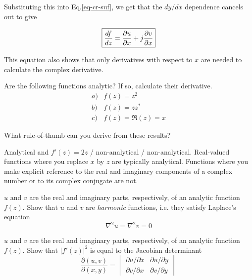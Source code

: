 Substituting this into Eq.\ref{eq-cr-suf}, we get that the $d y / d x$ dependence cancels out to give

\begin{equation}
\fbox{$\displaystyle
\frac{d f}{d z} = \frac{\partial u}{\partial x}+j\frac{\partial v}{\partial x}
$}
\end{equation} 

This equation also shows that only derivatives with respect to $x$ are needed to calculate the complex derivative.

\pagebreak

\begin{exer}
Are the following functions analytic? If so, calculate their derivative.
$$\begin{array}{lcll}a) & f(z)=z^2 \\b) & f(z)=z z^* \\c) & f(z)= \Re(z)=x \end{array}$$

What rule-of-thumb can you derive from these results?

\begin{sol}
Analytical and $f'(z)=2z$ / non-analytical / non-analytical. Real-valued functions where you replace $x$ by $z$ are typically analytical. Functions where you make explicit reference to the real and imaginary components of a complex number or to its complex conjugate are not.
\end{sol}
  
\end{exer}

\begin{exer}
\label{ex-harmonic}
$u$ and $v$ are the real and imaginary parts, respectively, of an analytic function $f(z)$. Show that $u$ and $v$ are \emph{harmonic} functions, i.e. they satisfy Laplace's equation
$$\nabla^2 u = \nabla^2 v = 0$$
\end{exer}

\begin{exer}
$u$ and $v$ are the real and imaginary parts, respectively, of an analytic function $f(z)$. Show that $|f'(z)|^2$ is equal to the Jacobian determinant
$$\frac{\partial (u,v)}{\partial (x,y)} =  \begin{vmatrix} \partial u / \partial x & \partial u / \partial y \\ \partial v / \partial x & \partial v / \partial y \end{vmatrix}$$
\end{exer}


